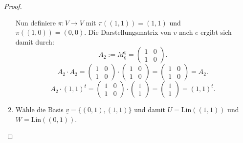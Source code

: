 \documentclass{article}
\begin{document}
\begin{proof}
\begin{enumerate}
        Nun definiere $\pi: V \to V$ mit $\pi((1,1)) = (1,1)$ und
        $\pi((1,0)) = (0,0)$. Die Darstellungsmatrix von $\underline{v}$
        nach  $\underline{e}$ ergibt sich damit durch:
         \[
             A_2 := M_{\underline{e}}^{\underline{v}} = \begin{pmatrix} 1 & 0 \\ 1 & 0 \end{pmatrix}
        .\]
        \[
            A_2 \cdot A_2 = \begin{pmatrix} 1 & 0 \\ 1 & 0 \end{pmatrix} 
            \cdot \begin{pmatrix}  1 & 0 \\ 1 & 0\end{pmatrix} 
            = \begin{pmatrix} 1 & 0 \\ 1 & 0 \end{pmatrix}  = A_2
        .\] \[
        A_2 \cdot (1,1)^{t} = \begin{pmatrix} 1 & 0 \\ 1 & 0 \end{pmatrix} 
        \cdot \begin{pmatrix} 1 \\ 1 \end{pmatrix} 
        = \begin{pmatrix} 1 \\ 1 \end{pmatrix}  = (1,1)^{t}
        .\]  
    \item Wähle die Basis  $\underline{v} =\{(0, 1), (1, 1)\}$ und damit
        $U = \text{Lin}((1,1))$ und $W = \text{Lin}((0,1))$.


\end{enumerate}
\end{proof}
\end{document}
